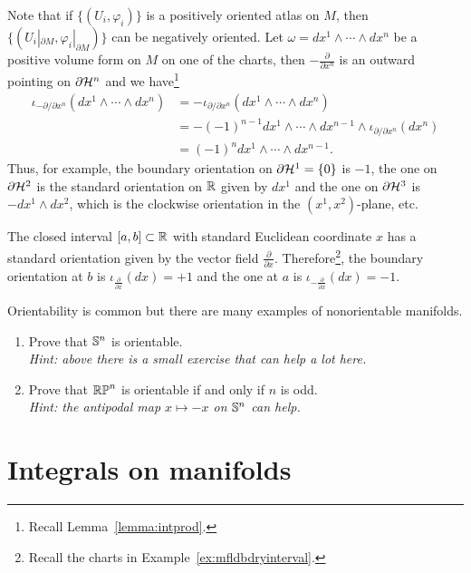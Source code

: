 Note that if $\{(U_i, \varphi_i)\}$ is a positively oriented atlas on $M$, then $\{(U_i|_{\partial M}, \varphi_i|_{\partial M})\}$ can be negatively oriented.
Let $\omega = dx^1\wedge\cdots\wedge dx^n$ be a positive volume form on $M$ on one of the charts, then $-\frac{\partial}{\partial x^n}$ is an outward pointing on $\partial \mathcal{H}^n$ and we have\footnote{Recall Lemma~\ref{lemma:intprod}.}
\begin{align}
	\iota_{-{\partial}/\!{\partial x^n}} (dx^1\wedge\cdots\wedge dx^n)
	 & = -\iota_{{\partial}/\!{\partial x^n}} (dx^1\wedge\cdots\wedge dx^n)                           \\
	 & = -(-1)^{n-1} dx^1\wedge\cdots\wedge dx^{n-1}\wedge \iota_{{\partial}/\!{\partial x^n}} (dx^n) \\
	 & = (-1)^n dx^1\wedge\cdots\wedge dx^{n-1}.
\end{align}
Thus, for example, the boundary orientation on $\partial \mathcal{H}^1 = \{0\}$ is $-1$, the one on $\partial \mathcal{H}^2$ is the standard orientation on $\mathbb{R}$ given by $dx^1$ and the one on $\partial \mathcal{H}^3$ is $-dx^1\wedge dx^2$, which is the clockwise orientation in the $(x^1, x^2)$-plane, etc.

\begin{example}\label{ex:int:bdryo}
	The closed interval $[a,b]\subset\mathbb{R}$ with standard Euclidean coordinate $x$ has a standard orientation given by the vector field $\frac{\partial}{\partial x}$.
	Therefore\footnote{Recall the charts in Example~\ref{ex:mfldbdryinterval}.}, the boundary orientation at $b$ is $\iota_{\frac{\partial}{\partial x}}(dx) = +1$ and the one at $a$ is $\iota_{-\frac{\partial}{\partial x}}(dx) = -1$.
\end{example}

\begin{exercise}
	Orientability is common but there are many examples of nonorientable manifolds.
	\begin{enumerate}
		\item Prove that $\mathbb{S}^n$ is orientable.\\
		      \textit{\small Hint: above there is a small exercise that can help a lot here.}
		\item Prove that $\mathbb{RP}^n$ is orientable if and only if $n$ is odd. \\
		      \textit{\small Hint: the antipodal map $x\mapsto -x$ on $\mathbb{S}^n$ can help.}
	\end{enumerate}
\end{exercise}

\section{Integrals on manifolds}

